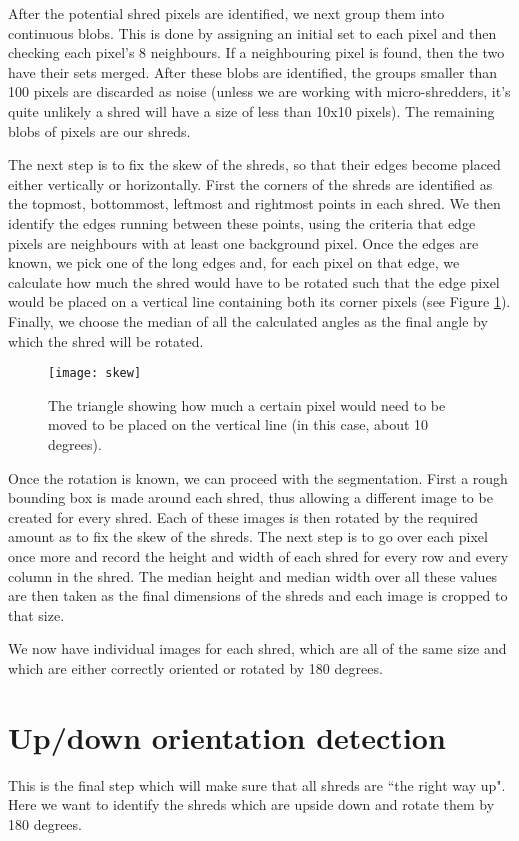 After the potential shred pixels are identified, we next group them into continuous blobs. This is done by assigning an initial set to each pixel and then checking each pixel's 8 neighbours. If a neighbouring pixel is found, then the two have their sets merged. After these blobs are identified, the groups smaller than 100 pixels are discarded as noise (unless we are working with micro-shredders, it's quite unlikely a shred will have a size of less than 10x10 pixels). The remaining blobs of pixels are our shreds.

The next step is to fix the skew of the shreds, so that their edges become placed either vertically or horizontally. First the corners of the shreds are identified as the topmost, bottommost, leftmost and rightmost points in each shred. We then identify the edges running between these points, using the criteria that edge pixels are neighbours with at least one background pixel. Once the edges are known, we pick one of the long edges and, for each pixel on that edge, we calculate how much the shred would have to be rotated such that the edge pixel would be placed on a vertical line containing both its corner pixels (see Figure \ref{fig:skew}). Finally, we choose the median of all the calculated angles as the final angle by which the shred will be rotated. 

\begin{figure}[h]
    \centering
    \texttt{[image: skew]}
    \caption{The triangle showing how much a certain pixel would need to be moved to be placed on the vertical line (in this case, about 10 degrees).}
    \label{fig:skew}
\end{figure}

Once the rotation is known, we can proceed with the segmentation. First a rough bounding box is made around each shred, thus allowing a different image to be created for every shred. Each of these images is then rotated by the required amount as to fix the skew of the shreds. The next step is to go over each pixel once more and record the height and width of each shred for every row and every column in the shred. The median height and median width over all these values are then taken as the final dimensions of the shreds and each image is cropped to that size. 

We now have individual images for each shred, which are all of the same size and which are either correctly oriented or rotated by 180 degrees.

\section{Up/down orientation detection}
This is the final step which will make sure that all shreds are ``the right way up". Here we want to identify the shreds which are upside down and rotate them by 180 degrees.

